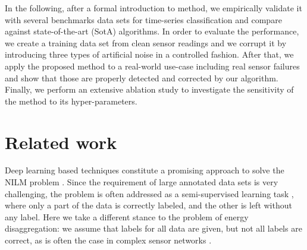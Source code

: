 \documentclass[runningheads, envcountsame, a4paper]{llncs}
\begin{document}
In the following, after a formal introduction to \acrshort{method}, we empirically validate it with several benchmarks data sets for time-series classification and compare against state-of-the-art (SotA) algorithms.
In order to evaluate the performance, we create a training data set from clean sensor readings 
and we corrupt it by introducing three types of artificial noise in a controlled fashion.
After that, we apply the proposed method to a real-world use-case including real sensor failures and show that those are properly detected and corrected by our algorithm.  
Finally, we perform an extensive ablation study to investigate the sensitivity of the \acrshort{method} to its hyper-parameters.





\section{Related work}
Deep learning based techniques constitute a promising approach to solve the NILM problem \cite{massidda2020non,Paresh2020MultiLabelAB}. 
Since the requirement of large annotated data sets is very challenging, the problem is often addressed as a semi-supervised learning task
\cite{humala2018universalnilm,barsim2015toward,yang2019semisupervised}, where only a part of the data is correctly labeled, and the other is left without any label.
Here we take a different stance to the problem of energy disaggregation: we assume that labels for all data are given, but not all labels are  correct, as is often the case in complex sensor networks \cite{frenay2013classification}.
\end{document}
